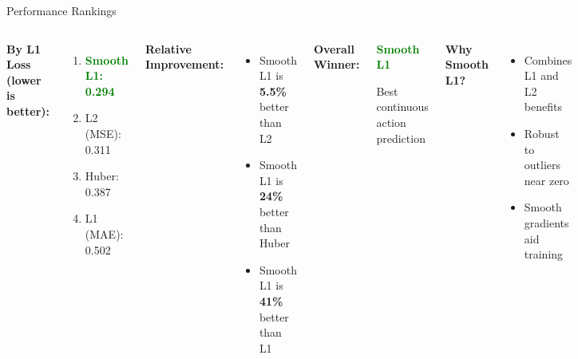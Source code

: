 \documentclass[aspectratio=169]{beamer}
\begin{document}
\begin{frame}{Performance Rankings}
\begin{columns}
\textbf{By L1 Loss (lower is better):}
\begin{enumerate}
    \item \textcolor{green}{\textbf{Smooth L1: 0.294}}
    \item L2 (MSE): 0.311
    \item Huber: 0.387
    \item L1 (MAE): 0.502
\end{enumerate}

\vspace{0.5cm}
\textbf{Relative Improvement:}
\begin{itemize}
    \item Smooth L1 is \textbf{5.5\%} better than L2
    \item Smooth L1 is \textbf{24\%} better than Huber
    \item Smooth L1 is \textbf{41\%} better than L1
\end{itemize}

\textbf{Overall Winner:}
\begin{center}
\Large{\textcolor{green}{\textbf{Smooth L1}}}

\vspace{0.2cm}
Best continuous action prediction
\end{center}

\vspace{0.5cm}
\textbf{Why Smooth L1?}
\begin{itemize}
    \item Combines L1 and L2 benefits
    \item Robust to outliers near zero
    \item Smooth gradients aid training
\end{itemize}
\end{columns}
\end{frame}
\end{document}
